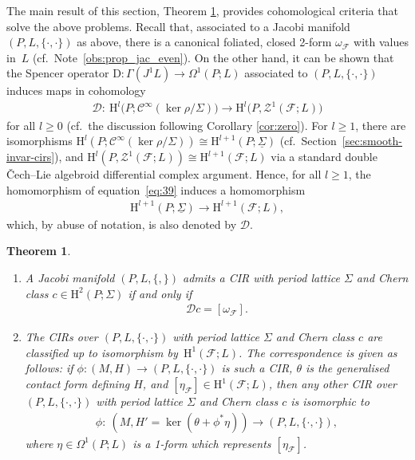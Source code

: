 \documentclass[pdftex]{sigma}
\numberwithin{equation}{section}
\newtheorem{Theorem}{Theorem}[section]
\newcommand{\JM}{(P,L,\{\cdot,\cdot\})} %
\newcommand{\CM}{(M,H)} %
\newcommand{\HH}{\mathrm{H}}
\begin{document}
The main result of this section, Theorem \ref{thm:main}, provides cohomological criteria that solve the above problems. Recall that, associated to a Jacobi manifold $\JM$ as above, there is a canonical foliated, closed 2-form $\omega_{\mathcal{F}}$ with values in~$L$ (cf.\ Note~\ref{obs:prop_jac_even}). On the other hand, it can be shown that the Spencer operator $\mathrm{D} \colon \Gamma (J^1L) \to \Omega^1\left(P;L\right)$ associated to $\JM$ induces maps in cohomology
\begin{gather} \label{eq:39}
 \mathcal{D} \colon \ \HH^l\big(P;\mathcal{C}^{\infty}(\ker \rho/\Sigma)\big)\to \HH^l\big(P,\mathcal{Z}^1(\mathcal{F};L)\big)
\end{gather}
for all $l \geq 0$ (cf.\ the discussion following Corollary \ref{cor:zero}). For $l \geq 1$, there are isomorphisms $\HH^l(P;\mathcal{C}^{\infty}(\ker \rho/\Sigma)) \cong \HH^{l+1}(P;\underline{\Sigma})$ (cf.\ Section~\ref{sec:smooth-invar-cirs}), and $\HH^l(P,\mathcal{Z}^1(\mathcal{F};L)) \cong
\HH^{l+1}(\mathcal{F};L)$ via a standard double \v{C}ech--Lie algebroid dif\/ferential complex argument. Hence, for all $l \geq 1$, the homomorphism of equation~\eqref{eq:39} induces a homomorphism
\begin{gather*}
 \HH^{l+1}(P;\underline{\Sigma})\to \HH^{l+1}(\mathcal{F};L),
\end{gather*}
which, by abuse of notation, is also denoted by $\mathcal{D}$.

\begin{Theorem}\label{thm:main}\quad
 \begin{enumerate}[label={\rm \arabic*.}, ref={\rm (\arabic*)}]\itemsep=0pt
 \item \label{item:19} A Jacobi manifold $(P,L,\{,\})$ admits a CIR with period lattice $\Sigma$ and Chern class $c \in \HH^2(P;\Sigma)$ if and only if
 \begin{gather*} %
 \mathcal{D}c = [\omega_{\mathcal{F}}].
 \end{gather*}
 \item \label{item:20} The CIRs over $\JM$ with period lattice $\Sigma$ and Chern class $c$ are classified up to isomorphism by~$\HH^1(\mathcal{F};L)$. The correspondence is given as follows: if $\phi \colon \CM \to \JM$ is such a CIR, $\theta$ is the generalised contact form defining $H$, and $[\eta_{\mathcal{F}}] \in \HH^1(\mathcal{F};L)$, then any other CIR over~$\JM$ with period lattice $\Sigma$ and Chern class $c$ is isomorphic to
 \begin{gather*}
 \phi \colon \ (M, H' = \ker (\theta + \phi^* \eta) ) \to \JM,
 \end{gather*}
 where $\eta \in \Omega^1(P;L)$ is a 1-form which represents $[\eta_{\mathcal{F}}]$.
\end{enumerate}
\end{Theorem}
\end{document}
